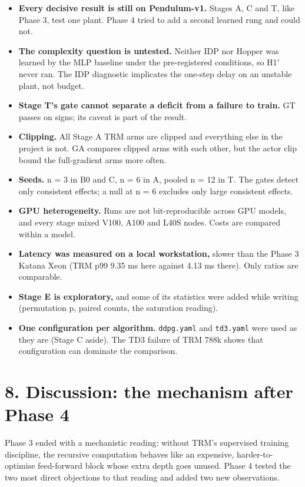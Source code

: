 \documentclass[11pt]{article}
\begin{document}
\begin{itemize}
\item \textbf{Every decisive result is still on Pendulum-v1.} Stages A, C and T, like Phase 3, test one plant. Phase 4 tried to add a second learned rung and could not.
\item \textbf{The complexity question is untested.} Neither IDP nor Hopper was learned by the MLP baseline under the pre-registered conditions, so H1$'$ never ran. The IDP diagnostic implicates the one-step delay on an unstable plant, not budget.
\item \textbf{Stage T's gate cannot separate a deficit from a failure to train.} GT passes on signs; its caveat is part of the result.
\item \textbf{Clipping.} All Stage A TRM arms are clipped and everything else in the project is not. GA compares clipped arms with each other, but the actor clip bound the full-gradient arms more often.
\item \textbf{Seeds.} n = 3 in B0 and C, n = 6 in A, pooled n = 12 in T. The gates detect only consistent effects; a null at n = 6 excludes only large consistent effects.
\item \textbf{GPU heterogeneity.} Runs are not bit-reproducible across GPU models, and every stage mixed V100, A100 and L40S nodes. Costs are compared within a model.
\item \textbf{Latency was measured on a local workstation,} slower than the Phase 3 Katana Xeon (TRM p99 9.35 ms here against 4.13 ms there). Only ratios are comparable.
\item \textbf{Stage E is exploratory,} and some of its statistics were added while writing (permutation p, paired counts, the saturation reading).
\item \textbf{One configuration per algorithm.} \texttt{ddpg.yaml} and \texttt{td3.yaml} were used as they are (Stage C aside). The TD3 failure of TRM 788k shows that configuration can dominate the comparison.
\end{itemize}



\section*{8. Discussion: the mechanism after Phase 4}



Phase 3 ended with a mechanistic reading: without TRM's supervised training discipline, the recursive computation behaves like an expensive, harder-to-optimise feed-forward block whose extra depth goes unused. Phase 4 tested the two most direct objections to that reading and added two new observations.
\end{document}
